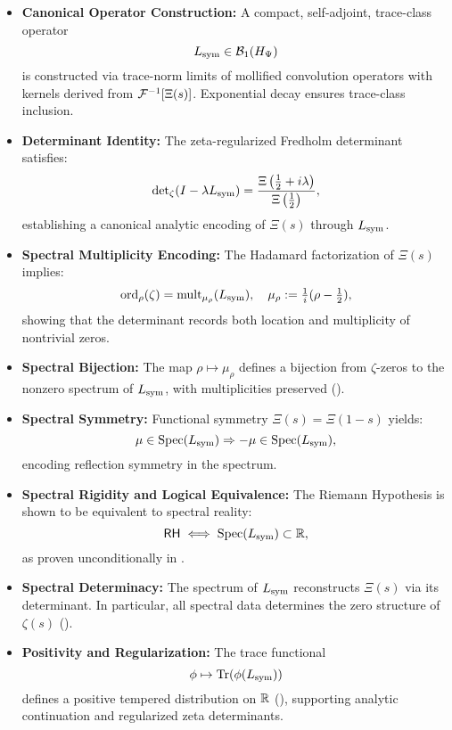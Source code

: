 \begin{itemize}
  \item \textbf{Canonical Operator Construction:}  
  A compact, self-adjoint, trace-class operator
  \[
  L_{\mathrm{sym}} \in \mathcal{B}_1(H_{\Psi})
  \]
  is constructed via trace-norm limits of mollified convolution operators with kernels derived from \( \mathcal{F}^{-1}[\Xi(s)] \). Exponential decay ensures trace-class inclusion.

  \item \textbf{Determinant Identity:}  
  The zeta-regularized Fredholm determinant satisfies:
  \[
  \det\nolimits_{\zeta}(I - \lambda L_{\mathrm{sym}}) = \frac{\Xi\left(\tfrac{1}{2} + i\lambda\right)}{\Xi\left(\tfrac{1}{2}\right)},
  \]
  establishing a canonical analytic encoding of \( \Xi(s) \) through \( L_{\mathrm{sym}} \).

  \item \textbf{Spectral Multiplicity Encoding:}  
  The Hadamard factorization of \( \Xi(s) \) implies:
  \[
  \operatorname{ord}_{\rho}(\zeta) = \operatorname{mult}_{\mu_\rho}(L_{\mathrm{sym}}), \quad
  \mu_\rho := \tfrac{1}{i}(\rho - \tfrac{1}{2}),
  \]
  showing that the determinant records both location and multiplicity of nontrivial zeros.

  \item \textbf{Spectral Bijection:}  
  The map \( \rho \mapsto \mu_\rho \) defines a bijection from \( \zeta \)-zeros to the nonzero spectrum of \( L_{\mathrm{sym}} \), with multiplicities preserved ().

  \item \textbf{Spectral Symmetry:}  
  Functional symmetry \( \Xi(s) = \Xi(1 - s) \) yields:
  \[
  \mu \in \operatorname{Spec}(L_{\mathrm{sym}}) \Rightarrow -\mu \in \operatorname{Spec}(L_{\mathrm{sym}}),
  \]
  encoding reflection symmetry in the spectrum.

  \item \textbf{Spectral Rigidity and Logical Equivalence:}  
  The Riemann Hypothesis is shown to be equivalent to spectral reality:
  \[
  \mathsf{RH} \iff \operatorname{Spec}(L_{\mathrm{sym}}) \subset \mathbb{R},
  \]
  as proven unconditionally in .

  \item \textbf{Spectral Determinacy:}  
  The spectrum of \( L_{\mathrm{sym}} \) reconstructs \( \Xi(s) \) via its determinant. In particular, all spectral data determines the zero structure of \( \zeta(s) \) ().

  \item \textbf{Positivity and Regularization:}  
  The trace functional
  \[
  \phi \mapsto \operatorname{Tr}(\phi(L_{\mathrm{sym}}))
  \]
  defines a positive tempered distribution on \( \mathbb{R} \) (), supporting analytic continuation and regularized zeta determinants.


\end{itemize}
